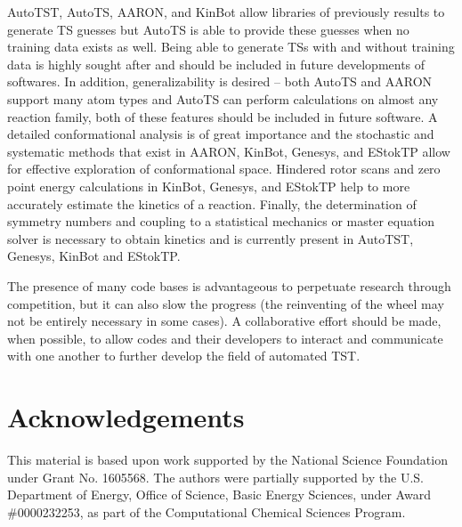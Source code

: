\documentclass[preprint, 11pt]{elsarticle} %
\begin{document}
AutoTST, AutoTS, AARON, and KinBot allow libraries of previously results to generate TS guesses but AutoTS is able to provide these guesses when no training data exists as well.
Being able to generate TSs with and without training data is highly sought after and should be included in future developments of softwares.
In addition, generalizability is desired -- both AutoTS and AARON support many atom types and AutoTS can perform calculations on almost any reaction family, both of these features should be included in future software.
A detailed conformational analysis is of great importance and the stochastic and systematic methods that exist in AARON, KinBot, Genesys, and EStokTP allow for effective exploration of conformational space.
Hindered rotor scans and zero point energy calculations in KinBot, Genesys, and EStokTP help to more accurately estimate the kinetics of a reaction.
Finally, the determination of symmetry numbers and coupling to a statistical mechanics or master equation solver is necessary to obtain kinetics and is currently present in AutoTST, Genesys, KinBot and EStokTP.

The presence of many code bases is advantageous to perpetuate research through competition, but it can also slow the progress (the reinventing of the wheel may not be entirely necessary in some cases).
A collaborative effort should be made, when possible, to allow codes and their developers to interact and communicate with one another to further develop the field of automated TST.



\section{Acknowledgements}

This material is based upon work supported by the National Science Foundation under Grant No. 1605568.
The authors were partially supported by the U.S. Department of Energy, Office of Science, Basic Energy Sciences, under Award \#0000232253, as part of the Computational Chemical Sciences Program.





\end{document}
